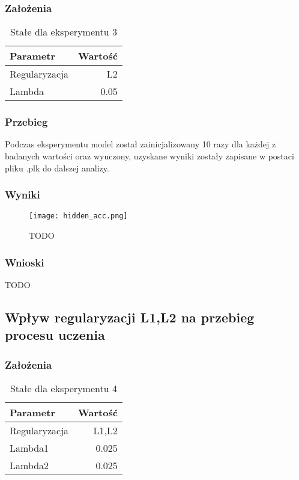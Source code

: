 \documentclass{article}
\begin{document}
\subsubsection*{Założenia}
\begin{table}[H]
	\caption{Stałe dla eksperymentu 3}
	\label{tabela-const-3}
	\centering
	\begin{tabular}{lr}
		\toprule
		Parametr      & Wartość \\
		\midrule
		Regularyzacja & L2        \\
		Lambda        & 0.05      \\
		\bottomrule
	\end{tabular}
\end{table}

\subsubsection*{Przebieg}

Podczas eksperymentu model został zainicjalizowany 10 razy dla każdej z badanych wartości oraz wyuczony, uzyskane wyniki zostały zapisane w postaci pliku .plk do dalszej analizy.

\subsubsection*{Wyniki}
\begin{figure}[H]
	\centering
	\caption{TODO}
	\texttt{[image: hidden\_acc.png]}
	\label{fig:res31}
\end{figure}


\subsubsection*{Wnioski}

TODO

\newpage
\subsection{Wpływ regularyzacji L1,L2 na przebieg procesu uczenia}
\subsubsection*{Założenia}
\begin{table}[H]
	\caption{Stałe dla eksperymentu 4}
	\label{tabela-const-4}
	\centering
	\begin{tabular}{lr}
		\toprule
		Parametr      & Wartość \\
		\midrule
		Regularyzacja & L1,L2     \\
		Lambda1       & 0.025     \\
		Lambda2       & 0.025     \\
		\bottomrule
	\end{tabular}
\end{table}
\end{document}

